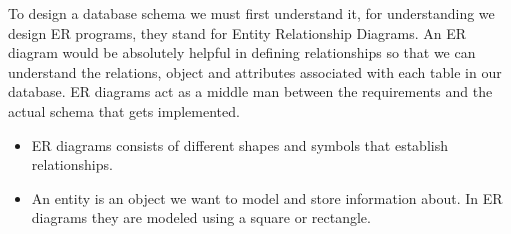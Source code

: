 To design a database schema we must first understand it, for understanding we design ER programs, they stand for Entity Relationship Diagrams.
An ER diagram would be absolutely helpful in defining relationships so that we can understand the relations, object and attributes associated with each table in our database.
ER diagrams act as a middle man between the requirements and the actual schema that gets implemented.
\begin{itemize}
    \item ER diagrams consists of different shapes and symbols that establish relationships.
    \item An entity is an object we want to model and store information about. In ER diagrams they are modeled using a square or rectangle.
\end{itemize}

